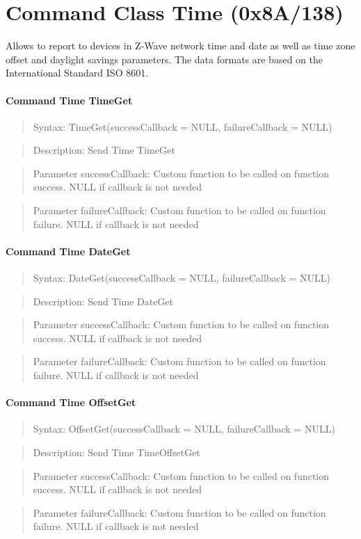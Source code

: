 \section{Command Class Time (0x8A/138)}

Allows to report to devices in Z-Wave network time and date as well as time zone offset and daylight savings parameters. The data formats are based on the International Standard ISO 8601.
\paragraph{Command Time TimeGet}
\begin{quote}Syntax: TimeGet(successCallback = NULL, failureCallback = NULL)\end{quote}
\begin{quote}Description: Send Time TimeGet\end{quote}
\begin{quote}Parameter successCallback: Custom function to be called on function success. NULL if callback is not needed\end{quote}
\begin{quote}Parameter failureCallback: Custom function to be called on function failure. NULL if callback is not needed\end{quote}


\paragraph{Command Time DateGet}
\begin{quote}Syntax: DateGet(successCallback = NULL, failureCallback = NULL)\end{quote}
\begin{quote}Description: Send Time DateGet\end{quote}
\begin{quote}Parameter successCallback: Custom function to be called on function success. NULL if callback is not needed\end{quote}
\begin{quote}Parameter failureCallback: Custom function to be called on function failure. NULL if callback is not needed\end{quote}


\paragraph{Command Time OffsetGet}
\begin{quote}Syntax: OffsetGet(successCallback = NULL, failureCallback = NULL)\end{quote}
\begin{quote}Description: Send Time TimeOffsetGet\end{quote}
\begin{quote}Parameter successCallback: Custom function to be called on function success. NULL if callback is not needed\end{quote}
\begin{quote}Parameter failureCallback: Custom function to be called on function failure. NULL if callback is not needed\end{quote}



